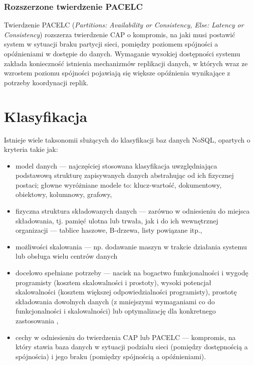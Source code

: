 \subsubsection*{Rozszerzone twierdzenie PACELC}

Twierdzenie PACELC (\textit{Partitions: Availability or Consistency, Else: Latency or Consistency}) rozszerza twierdzenie CAP o kompromis, na jaki musi postawić system w sytuacji braku partycji sieci, pomiędzy poziomem spójności a opóźnieniami w dostępie do danych. Wymaganie wysokiej dostępności systemu zakłada konieczność istnienia mechanizmów replikacji danych, w których wraz ze wzrostem poziomu spójności pojawiają się większe opóźnienia wynikające z potrzeby koordynacji replik.

\section{Klasyfikacja}

Istnieje wiele taksonomii służących do klasyfikacji baz danych NoSQL, opartych o kryteria takie jak:
\begin{itemize}
    \item model danych --- najczęściej stosowana klasyfikacja uwzględniająca podstawową strukturę zapisywanych danych abstrahując od ich fizycznej postaci; głowne wyróżniane modele to: klucz-wartość, dokumentowy, obiektowy, kolumnowy, grafowy,
    \item fizyczna struktura składowanych danych --- zarówno w odniesieniu do miejsca składowania, tj. pamięć ulotna lub trwała, jak i do ich wewnętrznej organizacji --- tablice haszowe, B-drzewa, listy powiązane itp.,
    \item możliwości skalowania --- np. dodawanie maszyn w trakcie działania systemu lub obsługa wielu centrów danych \cite{ell09a}
    \item docelowo spełniane potrzeby --- nacisk na bogactwo funkcjonalności i wygodę programisty (kosztem skalowalności i prostoty), wysoki potencjał skalowalności (kosztem większej odpowiedzialności programisty), prostotę składowania dowolnych danych (z mniejszymi wymaganiami co do funkcjonalności i skalowalności) lub optymalizację dla konkretnego zastosowania \cite{ham09},
    \item cechy w odniesieniu do twierdzenia CAP lub PACELC --- kompromis, na który stawia baza danych w sytuacji podziału sieci (pomiędzy dostępnością a spójnościa) i jego braku (pomiędzy spójnością a opóźnieniami).
\end{itemize}


